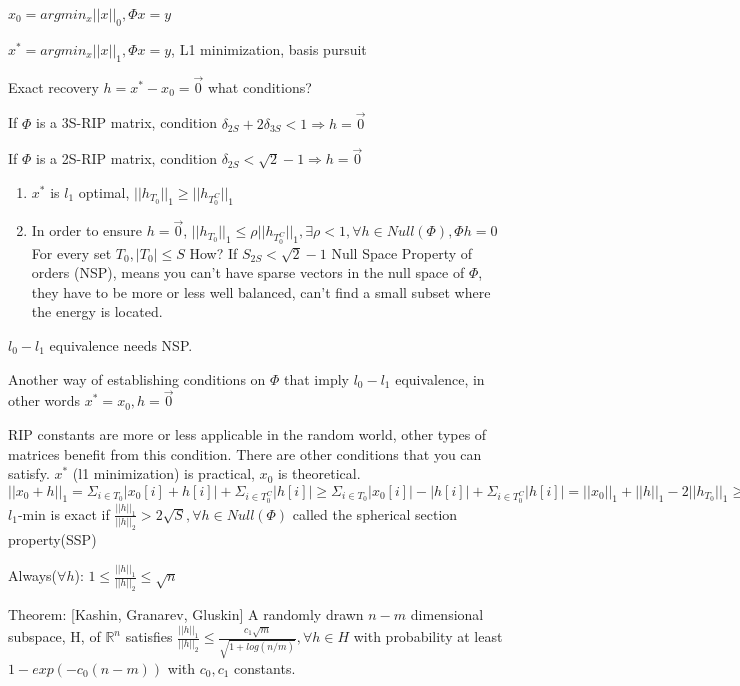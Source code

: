 \documentclass[12pt,letterpaper]{report}
\begin{document}
$x_0 =  argmin_x ||x||_0, \Phi x = y$

$x^* =  argmin_x ||x||_1, \Phi x = y$, L1 minimization, basis pursuit

Exact recovery $h = x^* - x_0 = \vec{0}$ what conditions?

If $\Phi$ is a 3S-RIP matrix, condition $\delta_{2S} + 2\delta_{3S} < 1 \Rightarrow h = \vec{0}$

If $\Phi$ is a 2S-RIP matrix, condition $\delta_{2S} < \sqrt{2} -1 \Rightarrow h = \vec{0}$

\begin{enumerate}
\item $x^*$ is $l_1$ optimal, $||h_{T_0}||_1 \geq ||h_{T_0^C}||_1$
\item In order to ensure $h = \vec{0}$, $||h_{T_0}||_1 \leq \rho||h_{T_0^C}||_1, \exists \rho < 1, \forall h \in Null(\Phi), \Phi h = 0$ For every set $T_0, |T_0| \leq S$  How?  If $S_{2S} < \sqrt{2} - 1$ Null Space Property of orders (NSP), means you can't have sparse vectors in the null space of $\Phi$, they have to be more or less well balanced, can't find a small subset where the energy is located.
\end{enumerate}

$l_0 - l_1$ equivalence needs NSP.

Another way of establishing conditions on $\Phi$ that imply $l_0 - l_1$ equivalence, in other words $x^* = x_0, h = \vec{0}$

RIP constants are more or less applicable in the random world, other types of matrices benefit from this condition.  There are other conditions that you can satisfy.  $x^*$ (l1 minimization) is practical, $x_0$ is theoretical. $||x_0 + h||_1 = \Sigma_{i \in T_0} |x_0[i] + h[i]| + \Sigma_{i \in T_0^C} |h[i]| \geq \Sigma_{i \in T_0} |x_0[i]| - |h[i]| + \Sigma_{i \in T_0^C} |h[i]| = ||x_0||_1 + ||h||_1 - 2||h_{T_0}||_1 \geq ||x_0||_1 + ||h||_1 - 2\sqrt{S}||h_{T_0}||_2 \geq ||x_0||_1 + ||h||_1 - 2\sqrt{S}||h||_2 \Rightarrow$ $l_1$-min is exact if $\frac{||h||_1}{||h||_2} > 2 \sqrt{S}, \forall h \in Null(\Phi)$ called the spherical section property(SSP)

Always($\forall h$): $1 \leq \frac{||h||_1}{||h||_2} \leq \sqrt{n}$


Theorem: [Kashin, Granarev, Gluskin] A randomly drawn $n-m$ dimensional subspace, H, of $\mathbb{R}^n$ satisfies $\frac{||h||_1}{||h||_2} \leq \frac{c_1 \sqrt{m}}{\sqrt{1 + log(n/m)}}, \forall	 h \in H$ with probability at least $1 - exp(-c_0(n-m))$ with $c_0, c_1$ constants.
\end{document}
